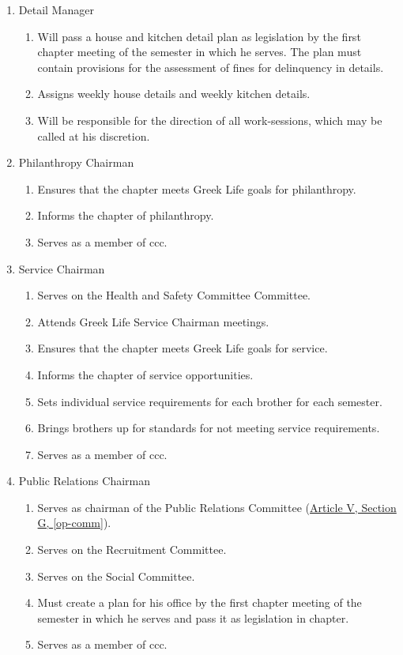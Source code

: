 \begin{enumerate}
				\item Detail Manager
					\begin{enumerate}
						\item Will pass a house and kitchen detail plan as legislation by the first chapter meeting of the semester in which he serves. The plan must contain provisions for the assessment of fines for delinquency in details.
						\item Assigns weekly house details and weekly kitchen details.
						\item Will be responsible for the direction of all \glspl{work-session}, which may be called at his discretion.
					\end{enumerate}

				\item Philanthropy Chairman
					\begin{enumerate}
						\item Ensures that the chapter meets Greek Life goals for philanthropy.
						\item Informs the chapter of philanthropy.
						\item Serves as a member of \gls{ccc}.
					\end{enumerate}
					
				\item Service Chairman
					\begin{enumerate}
						\item Serves on the Health and Safety Committee Committee.
						\item Attends Greek Life Service Chairman meetings.
						\item Ensures that the chapter meets Greek Life goals for service.
						\item Informs the chapter of service opportunities.
						\item Sets individual service requirements for each brother for each semester.
						\item Brings brothers up for standards for not meeting service requirements.
						\item Serves as a member of \gls{ccc}.
					\end{enumerate}
				
				
				\item Public Relations Chairman
					\begin{enumerate}
						\item Serves as chairman of the Public Relations Committee (\hyperref[op-comm]{Article V, Section G, \autoref*{op-comm}}).
						\item Serves on the Recruitment Committee.
						\item Serves on the Social Committee.
						\item Must create a plan for his office by the first chapter meeting of the semester in which he serves and pass it as legislation in chapter.
						\item Serves as a member of \gls{ccc}.
					\end{enumerate}


\end{enumerate}
